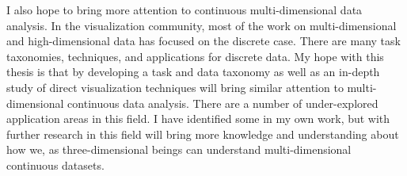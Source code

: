 I also hope to bring more attention to continuous multi-dimensional data analysis.
In the visualization community, most of the work on multi-dimensional and high-dimensional
data has focused on the discrete case. There are many task taxonomies, techniques,
and applications for discrete data. My hope with this thesis is that by developing
a task and data taxonomy as well as an in-depth study of direct visualization
techniques will bring similar attention to multi-dimensional continuous data
analysis. There are a number of under-explored application areas in this
field. I have identified some in my own work, but with further research in this
field will bring more knowledge and understanding about how we, as three-dimensional
beings can understand multi-dimensional continuous datasets.





